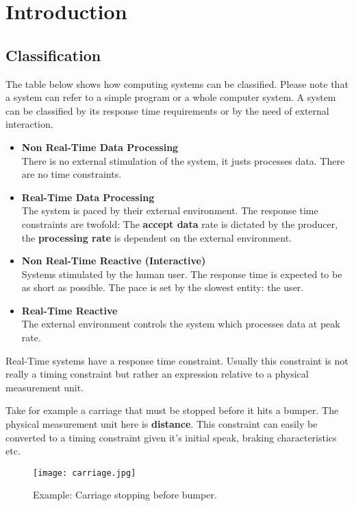 \documentclass[../main.tex]{subfiles}
\begin{document}
\chapter{Introduction}

\section{Classification}

The table below shows how computing systems can be classified. Please note that a system can refer to a simple program or a whole computer system. A system can be classified by its response time requirements or by the need of external interaction. 

\begin{itemize}
	\item \textbf{Non Real-Time Data Processing} \\
	There is no external stimulation of the system, it justs processes data. There are no time constraints.
	\item \textbf{Real-Time Data Processing} \\
	The system is paced by their external environment. The response time constraints are twofold: The \textbf{accept data} rate is dictated by the producer, the \textbf{processing rate} is dependent on the external environment.
	\item \textbf{Non Real-Time Reactive (Interactive)} \\
	Systems stimulated by the human user. The response time is expected to be as short as possible. The pace is set by the slowest entity: the user.
	\item \textbf{Real-Time Reactive} \\
	The external environment controls the system which processes data at peak rate.
\end{itemize}

Real-Time systems have a response time constraint. Usually this constraint is not really a timing constraint but rather an expression relative to a physical measurement unit.

\begin{exmp}
Take for example a carriage that must be stopped before it hits a bumper. The physical measurement unit here is \textbf{distance}. This constraint can easily be converted to a timing constraint given it's initial speak, braking characteristics etc. 
\begin{figure}[H]
    \centering
    \texttt{[image: carriage.jpg]}
    \caption{Example: Carriage stopping before bumper.}
    \label{carriage}
\end{figure}
\end{exmp}
\end{document}
